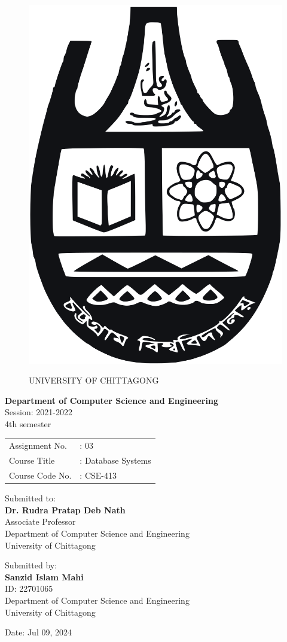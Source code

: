 
\begin{figure}[h]
		\vspace*{-1em}
		\centering
		\includegraphics[width=0.2\linewidth]{university_logo.png}
		\par
		\vspace*{2em}
		{\Large UNIVERSITY OF CHITTAGONG}
\end{figure}
\begin{center}
		\vspace*{3em}
		\textbf{Department of Computer Science and Engineering} \\
		\bigskip
		Session: 2021-2022 \\
		4th semester \\
		\bigskip
		\begin{tabular}{l l}
		  Assignment No. &: 03\\
		  Course Title &: Database Systems \\
		  Course Code No. &: CSE-413 \\
		\end{tabular}
\end{center}

\begin{center}
		\vspace*{3em}
		Submitted to: \\
		\textbf{Dr. Rudra Pratap Deb Nath} \\
		Associate Professor \\
		Department of Computer Science and Engineering \\
		University of Chittagong
\end{center}

\begin{center}
		\vspace*{3em}
		Submitted by: \\
		\textbf{Sanzid Islam Mahi} \\
		ID: 22701065 \\
		Department of Computer Science and Engineering \\
		University of Chittagong
\end{center}




\begin{center}
	\vspace*{3em}
	Date: Jul 09, 2024
\end{center}